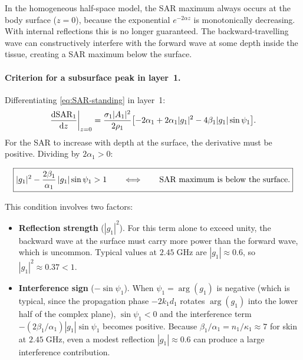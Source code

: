 In the homogeneous half-space model, the SAR maximum always occurs at the
body surface ($z = 0$), because the exponential $e^{-2\alpha z}$ is
monotonically decreasing.  With internal reflections this is no longer
guaranteed.  The backward-travelling wave can constructively interfere
with the forward wave at some depth inside the tissue, creating a SAR
maximum below the surface.

\paragraph{Criterion for a subsurface peak in layer~1.}
Differentiating \cref{eq:SAR-standing} in layer~1:
\begin{equation}\label{eq:dSAR-dz}
  \frac{\mathrm{d}\mathrm{SAR}_1}{\mathrm{d}z}\bigg|_{z=0}
  = \frac{\sigma_1 |A_1|^2}{2\rho_1}
    \bigl[
      -2\alpha_1
      + 2\alpha_1 |g_1|^2
      - 4\beta_1 |g_1|\sin\psi_1
    \bigr].
\end{equation}
For the SAR to increase with depth at the surface, the derivative must be
positive.  Dividing by $2\alpha_1 > 0$:

\begin{equation}\label{eq:subsurface-condition}
  \boxed{%
    |g_1|^2 - \frac{2\beta_1}{\alpha_1}\,|g_1|\sin\psi_1 > 1
    \qquad\Longleftrightarrow\qquad
    \text{SAR maximum is below the surface.}
  }
\end{equation}

\noindent
This condition involves two factors:

\begin{itemize}[nosep]
\item \textbf{Reflection strength} ($|g_1|^2$).  For this term alone to
  exceed unity, the backward wave at the surface must carry more power
  than the forward wave, which is uncommon.  Typical values at
  $2.45\;\mathrm{GHz}$ are $|g_1| \approx 0.6$, so $|g_1|^2 \approx 0.37
  < 1$.

\item \textbf{Interference sign} ($-\sin\psi_1$).  When
  $\psi_1 = \arg(g_1)$ is negative (which is typical, since the
  propagation phase $-2k_1 d_1$ rotates $\arg(g_1)$ into the lower half
  of the complex plane), $\sin\psi_1 < 0$ and the interference term
  $-(2\beta_1/\alpha_1)|g_1|\sin\psi_1$ becomes positive.  Because
  $\beta_1/\alpha_1 = n_1/\kappa_1 \approx 7$ for skin at
  $2.45\;\mathrm{GHz}$, even a modest reflection $|g_1| \approx 0.6$ can
  produce a large interference contribution.
\end{itemize}

